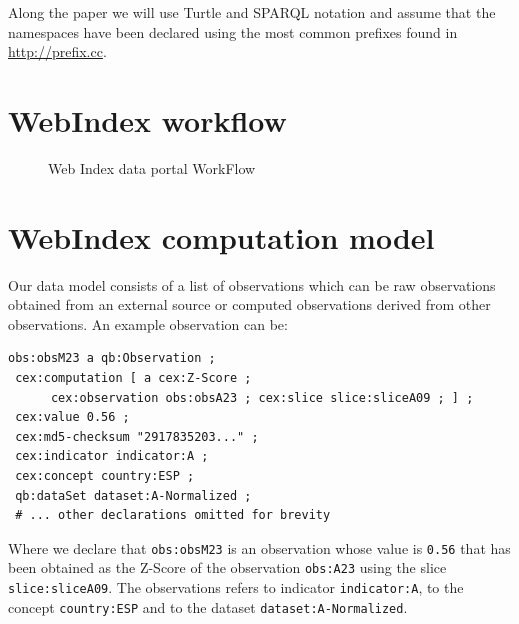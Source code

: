 \documentclass{acm_proc_article-sp}
\begin{document}
 Along the paper we will use Turtle and SPARQL notation and assume that the
namespaces have been declared using the most common prefixes found in
\url{http://prefix.cc}.

\section{WebIndex workflow}

\begin{figure}[h]
\label{Fig:WebIndexWorkFlow}
\begin{center}
\end{center}
\caption{Web Index data portal WorkFlow}
\end{figure}

\section{WebIndex computation model}

Our data model consists of a list of observations which can be raw observations
obtained from an external source or computed observations derived from other
observations. An example observation can be:

\begin{lstlisting}[style=SPARQL]
obs:obsM23 a qb:Observation ;
 cex:computation [ a cex:Z-Score ; 
      cex:observation obs:obsA23 ; cex:slice slice:sliceA09 ; ] ;
 cex:value 0.56 ;
 cex:md5-checksum "2917835203..." ;
 cex:indicator indicator:A ;
 cex:concept country:ESP ;
 qb:dataSet dataset:A-Normalized ;
 # ... other declarations omitted for brevity
\end{lstlisting}

Where we declare that \lstinline|obs:obsM23| is an observation
 whose value is \lstinline|0.56| that has been obtained as the Z-Score
 of the observation \lstinline|obs:A23| using the slice
 \lstinline|slice:sliceA09|. The observations refers to indicator
 \lstinline|indicator:A|, to the concept \lstinline|country:ESP| and to the
 dataset \lstinline|dataset:A-Normalized|.
 
\end{document}
